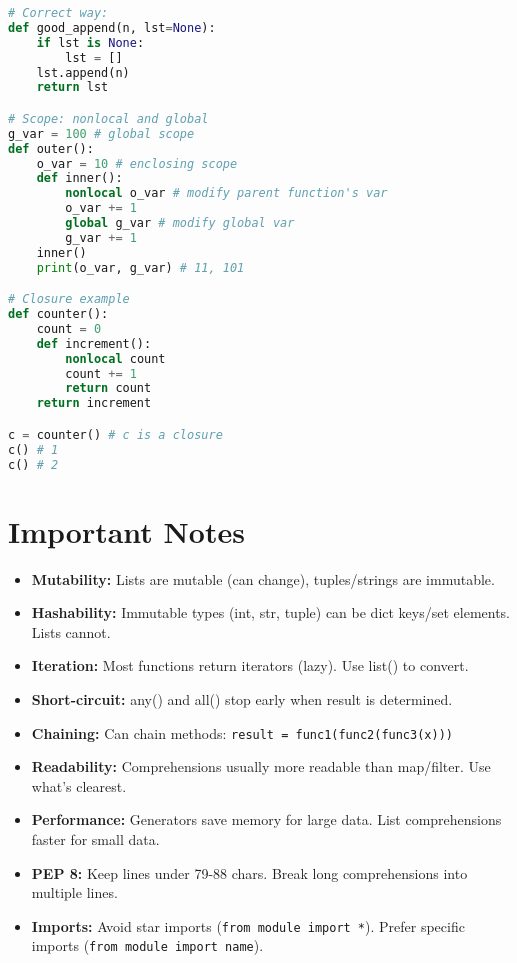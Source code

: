 \documentclass[8pt,landscape]{article}
\begin{document}
\begin{multicols}{3}
\begin{lstlisting}[language=Python]
# Correct way:
def good_append(n, lst=None):
    if lst is None:
        lst = []
    lst.append(n)
    return lst

# Scope: nonlocal and global
g_var = 100 # global scope
def outer():
    o_var = 10 # enclosing scope
    def inner():
        nonlocal o_var # modify parent function's var
        o_var += 1
        global g_var # modify global var
        g_var += 1
    inner()
    print(o_var, g_var) # 11, 101

# Closure example
def counter():
    count = 0
    def increment():
        nonlocal count
        count += 1
        return count
    return increment

c = counter() # c is a closure
c() # 1
c() # 2
\end{lstlisting}

\section*{Important Notes}
\begin{itemize}
\item \textbf{Mutability:} Lists are mutable (can change), tuples/strings are immutable.
\item \textbf{Hashability:} Immutable types (int, str, tuple) can be dict keys/set elements. Lists cannot.
\item \textbf{Iteration:} Most functions return iterators (lazy). Use list() to convert.
\item \textbf{Short-circuit:} any() and all() stop early when result is determined.
\item \textbf{Chaining:} Can chain methods: \lstinline|result = func1(func2(func3(x)))|
\item \textbf{Readability:} Comprehensions usually more readable than map/filter. Use what's clearest.
\item \textbf{Performance:} Generators save memory for large data. List comprehensions faster for small data.
\item \textbf{PEP 8:} Keep lines under 79-88 chars. Break long comprehensions into multiple lines.
\item \textbf{Imports:} Avoid star imports (\lstinline|from module import *|). Prefer specific imports (\lstinline|from module import name|).
\end{itemize}

\end{multicols}
\end{document}
